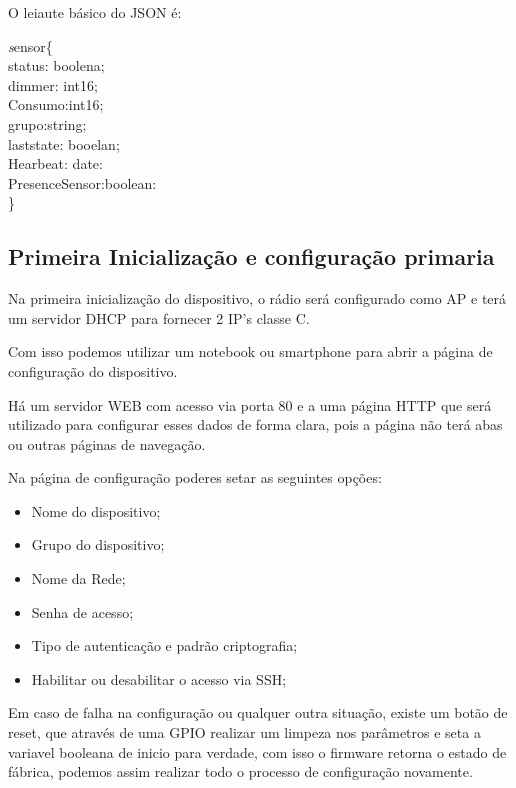 \documentclass[openright]{normas-utf-tex} %
\begin{document}
O leiaute básico do JSON é:

\begin{center}
\textit
sensor\{\\ 
status: boolena; \\
dimmer: int16;\\
Consumo:int16; \\
grupo:string;\\
laststate: booelan;\\
Hearbeat: date: \\
PresenceSensor:boolean:\\
\}
\end{center}
\subsection{Primeira Inicialização e configuração primaria}


Na primeira inicialização do dispositivo, o rádio será configurado como AP e terá um servidor DHCP para fornecer 2 IP's classe C.

Com isso podemos utilizar um notebook ou smartphone para abrir a página de configuração do dispositivo.

Há  um servidor WEB com acesso via porta 80 e a uma página HTTP que será utilizado para configurar esses dados de forma clara, pois a página não terá abas ou outras páginas de navegação.

Na página de configuração poderes setar as seguintes opções:
\begin{itemize}
    \item Nome do dispositivo;
    \item Grupo do dispositivo;
    \item Nome da Rede;
    \item Senha de acesso;
    \item Tipo de autenticação e padrão criptografia;
    \item Habilitar ou desabilitar o acesso via SSH;
\end{itemize}

Em caso de falha na configuração ou qualquer outra situação, existe um botão de reset, que através de uma GPIO \cite{Elsevier} realizar um limpeza nos parâmetros e seta a variavel booleana de inicio para verdade, com isso o firmware retorna o estado de fábrica, podemos assim realizar todo o processo de configuração novamente.
\end{document}
